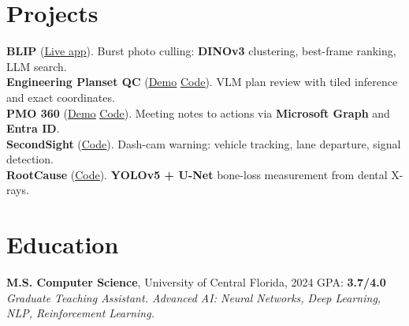 \documentclass[11pt,letterpaper]{article}
\newcommand{\projgap}{3.5pt}     %
\newcommand{\projectentry}[3]{%
\noindent\textbf{#1} {\small (#2). #3}\\[\projgap]
}
\begin{document}
\section{Projects}

\projectentry
{BLIP}
{\href{https://huggingface.co/spaces/Jayasurya23/photo-culling}{\underline{Live app}}}
{Burst photo culling: \textbf{DINOv3} clustering, best-frame ranking, LLM search.}

\projectentry
{Engineering Planset QC}
{\href{https://jayasurya23.github.io/planset-qc-demo/}{\underline{Demo}}
\;\textbar\;
\href{https://github.com/jayasurya23/planset-qc-demo}{\underline{Code}}}
{VLM plan review with tiled inference and exact coordinates.}

\projectentry
{PMO 360}
{\href{https://jayasurya23.github.io/Project-Management-Portal-Demo}{\underline{Demo}}
\;\textbar\;
\href{https://github.com/jayasurya23/Project-Management-Portal-Demo}{\underline{Code}}}
{Meeting notes to actions via \textbf{Microsoft Graph} and \textbf{Entra ID}.}

\projectentry
{SecondSight}
{\href{https://github.com/jayasurya23/Warning-system-for-automobile-drivers}{\underline{Code}}}
{Dash-cam warning: vehicle tracking, lane departure, signal detection.}

\projectentry
{RootCause}
{\href{https://github.com/jayasurya23/Dental-X-Ray-Detection}{\underline{Code}}}
{\textbf{YOLOv5 + U-Net} bone-loss measurement from dental X-rays.}

\section{Education}

\textbf{M.S. Computer Science}, University of Central Florida, 2024
\hfill GPA: \textbf{3.7/4.0}\\[1pt]
\textit{Graduate Teaching Assistant. Advanced AI: Neural Networks, Deep
Learning, NLP, Reinforcement Learning.}
\end{document}
